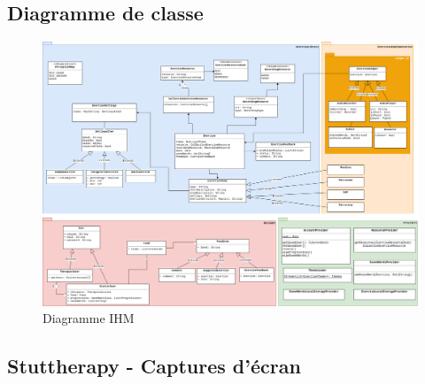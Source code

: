 \begin{appendices}
\begin{landscape}
\chapter{Diagramme de classe}
\label{appendix:class}
\vspace{-35pt}
\begin{figure}[H]
  \includegraphics[width=0.9\linewidth]{content/imgs/app_class_diagram.png}
  \caption*{Diagramme IHM}
\end{figure}
\end{landscape}


\begin{landscape}
\chapter{Stuttherapy - Captures d'écran}
\label{appendix:screenshots}


\end{landscape}
\end{appendices}
